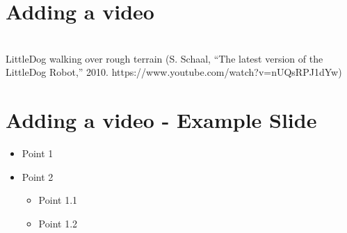 \documentclass[%
    fourtothree=true, %
    DepLogo=true     %
    ]{ETHpres}
\begin{document}
\ETHslide
\section*{Adding a video}
\\
		\footnotesize{LittleDog walking over rough terrain (S. Schaal, ``The latest version of the LittleDog Robot,'' 2010. https://www.youtube.com/watch?v=nUQsRPJ1dYw)}
			
\clearpage


\ETHslide
\section*{Adding a video - Example Slide}
\begin{minipage}{0.6\textwidth}
	\begin{itemize}
		\item[\ETHitem] Point 1
		\item[\ETHitem] Point 2
		\begin{itemize}
			\item Point 1.1
			\item Point 1.2
		\end{itemize}
\end{itemize}
\end{minipage}
\end{document}
